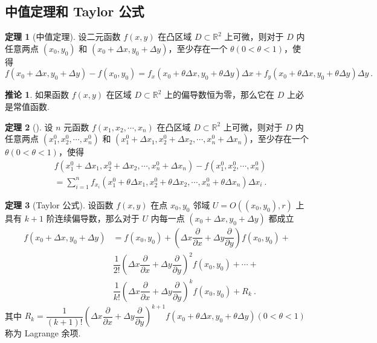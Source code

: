 \documentclass[zihao=-4,linespread=1.8,UTF8,nothm]{aytony_base}
\theoremstyle{definition}
\newtheorem{theorem}{\indent\heiti\textbf{定理}}[subsection]
\newtheorem*{corollary}{\indent\heiti\textbf{推论}}
\begin{document}
\subsection{中值定理和 Taylor 公式}

\begin{theorem}[中值定理]
    设二元函数 $f(x, y)$ 在凸区域 $D \subset \mathbb{R}^2$ 上可微，则对于 $D$ 内任意两点 $(x_0, y_0)$ 和 $(x_0 + \Delta x, y_0 + \Delta y)$，至少存在一个 $\theta(0 < \theta < 1)$，使得 $$
        f(x_0 + \Delta x, y_0 + \Delta y) - f(x_0, y_0) = f_x(x_0 + \theta\Delta x, y_0 + \theta\Delta y)\Delta x + f_y(x_0 + \theta \Delta x, y_0 + \theta \Delta y)\Delta y\ .
    $$
\end{theorem}

\begin{corollary}
    如果函数 $f(x, y)$ 在区域 $D \subset \mathbb{R}^2$ 上的偏导数恒为零，那么它在 $D$ 上必是常值函数.
\end{corollary}

\begin{theorem}[]
    设 $n$ 元函数 $f({x}_1, {x}_2, \cdots, {x}_{n})$ 在凸区域 $D \subset \mathbb{R}^2$ 上可微，则对于 $D$ 内任意两点 $(x_1^0, x_2^0, \cdots, x_n^0)$ 和 $(x_1^0 + \Delta x_1, x_2^0 + \Delta x_2, \cdots, x_n^0 + \Delta x_n)$，至少存在一个 $\theta(0 < \theta < 1)$，使得 $$
        \begin{aligned}
             & f(x_1^0 + \Delta x_1, x_2^0 + \Delta x_2, \cdots, x_n^0 + \Delta x_n) - f(x_1^0, x_2^0, \cdots, x_n^0)                              \\
             & = \sum\limits_{i = 1}^{n}f_{x_i}(x_1^0 + \theta\Delta x_1, x_2^0 + \theta\Delta x_2, \cdots, x_n^0 + \theta\Delta x_n)\Delta x_i\ .
        \end{aligned}$$
\end{theorem}

\begin{theorem}[Taylor 公式]
    设函数 $f(x, y)$ 在点 $x_0, y_0$ 邻域 $U = O((x_0, y_0), r)$ 上具有 $k + 1$ 阶连续偏导数，那么对于 $U$ 内每一点 $(x_0 + \Delta x, y_0 + \Delta y)$ 都成立 $$
        \begin{aligned}
            f(x_0 + \Delta x, y_0 + \Delta y) & = f(x_0, y_0) + \left(\Delta x \dfrac{\partial }{\partial x} + \Delta y \dfrac{\partial }{\partial y}\right)f(x_0, y_0) +         \\
                                              & \dfrac{1}{2!}\left(\Delta x \dfrac{\partial }{\partial x} + \Delta y \dfrac{\partial }{\partial y}\right)^2f(x_0, y_0) + \cdots + \\
                                              & \dfrac{1}{k!}\left(\Delta x \dfrac{\partial }{\partial x} + \Delta y \dfrac{\partial }{\partial y}\right)^kf(x_0, y_0) + R_k\ .
        \end{aligned}
    $$ 其中 $R_k = \dfrac{1}{(k+1)!}\left(\Delta x \dfrac{\partial }{\partial x} + \Delta y \dfrac{\partial }{\partial y}\right)^{k+1}f(x_0 +\theta \Delta x, y_0 + \theta \Delta y)(0 < \theta < 1)$ 称为 Lagrange 余项.
\end{theorem}
\end{document}
